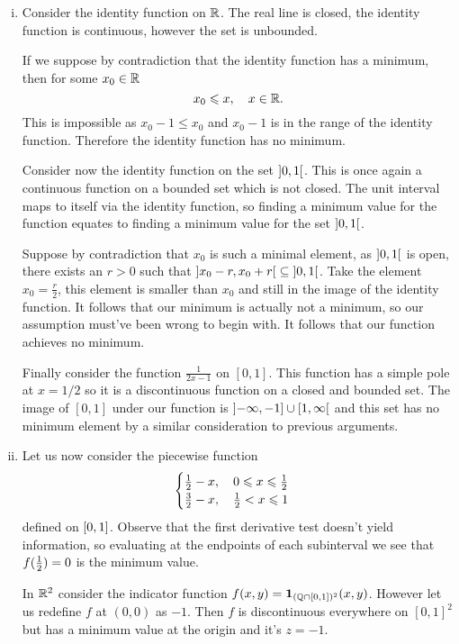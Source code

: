 \documentclass[12pt]{memoir}
\begin{document}
\begin{ptcbr}
\begin{enumerate}[i)]
    \itemsep=-0.4em
    \item Consider the identity function on $\mathbb{R}$. The real line is closed, the identity function is continuous, however the set is unbounded.\par 
    If we suppose by contradiction that the identity function has a minimum, then for some $x_0\in\mathbb{R}$ 
    $$x_0\leqslant x,\quad x\in\mathbb{R}.$$
    This is impossible as $x_0-1\leq x_0$ and $x_0-1$ is in the range of the identity function. Therefore the identity function has no minimum.\par
    Consider now the identity function on the set $\left\rbrack0,1\right\lbrack$. This is once again a continuous function on a bounded set which is not closed. The unit interval maps to itself via the identity function, so finding a minimum value for the function equates to finding a minimum value for the set $\left\rbrack0,1\right\lbrack$.\par 
    Suppose by contradiction that $x_0$ is such a minimal element, as $\left\rbrack0,1\right\lbrack$ is open, there exists an $r>0$ such that $\left\rbrack x_0-r,x_0+r\right\lbrack\subseteq\left\rbrack0,1\right\lbrack$. Take the element $x_0=\frac{r}{2}$, this element is smaller than $x_0$ and still in the image of the identity function. It follows that our minimum is actually not a minimum, so our assumption must've been wrong to begin with. It follows that our function achieves no minimum.\par
    Finally consider the function $\frac{1}{2x-1}$ on $[0,1]$. This function has a simple pole at $x=1/2$ so it is a discontinuous function on a closed and bounded set. The image of $[0,1]$ under our function is $\left\rbrack-\infty,-1\right\rbrack\cup\left\lbrack1,\infty\right\lbrack$ and this set has no minimum element by a similar consideration to previous arguments.
    \item Let us now consider the piecewise function 
    $$\begin{cases}
        \half-x,\quad 0\leq x\leq\half\\
        \frac32-x,\quad \half<x\leq1
    \end{cases}$$
    defined on $\left\lbrack0,1\right\rbrack$. Observe that the first derivative test doesn't yield information, so evaluating at the endpoints of each subinterval we see that $f(\half)=0$ is the minimum value.\par 
    In $\mathbb{R}^2$ consider the indicator function $f(x,y)=\mathbf{1}_{(\mathbb{Q}\cap\left\lbrack0,1\right\rbrack)^2}(x,y)$. However let us redefine $f$ at $(0,0)$ as $-1$. Then $f$ is discontinuous everywhere on $[0,1]^2$ but has a minimum value at the origin and it's $z=-1$.

\end{enumerate}
\end{ptcbr}
\end{document}

